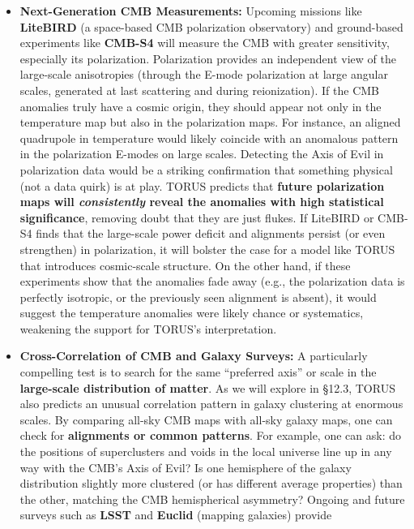 \documentclass[
]{article}
\begin{document}
\begin{itemize}
\item
  \textbf{Next-Generation CMB Measurements:} Upcoming missions like
  \textbf{LiteBIRD} (a space-based CMB polarization observatory) and
  ground-based experiments like \textbf{CMB-S4} will measure the CMB
  with greater sensitivity, especially its polarization. Polarization
  provides an independent view of the large-scale anisotropies (through
  the E-mode polarization at large angular scales, generated at last
  scattering and during reionization). If the CMB anomalies truly have a
  cosmic origin, they should appear not only in the temperature map but
  also in the polarization maps. For instance, an aligned quadrupole in
  temperature would likely coincide with an anomalous pattern in the
  polarization E-modes on large scales. Detecting the Axis of Evil in
  polarization data would be a striking confirmation that something
  physical (not a data quirk) is at play. TORUS predicts that
  \textbf{future polarization maps will \emph{consistently} reveal the
  anomalies with high statistical significance}, removing doubt that
  they are just flukes\hspace{0pt}. If LiteBIRD or CMB-S4 finds that the
  large-scale power deficit and alignments persist (or even strengthen)
  in polarization, it will bolster the case for a model like TORUS that
  introduces cosmic-scale structure. On the other hand, if these
  experiments show that the anomalies fade away (e.g., the polarization
  data is perfectly isotropic, or the previously seen alignment is
  absent), it would suggest the temperature anomalies were likely chance
  or systematics, weakening the support for TORUS's interpretation.
\item
  \textbf{Cross-Correlation of CMB and Galaxy Surveys:} A particularly
  compelling test is to search for the same ``preferred axis'' or scale
  in the \textbf{large-scale distribution of matter}. As we will explore
  in §12.3, TORUS also predicts an unusual correlation pattern in galaxy
  clustering at enormous scales. By comparing all-sky CMB maps with
  all-sky galaxy maps, one can check for \textbf{alignments or common
  patterns}. For example, one can ask: do the positions of superclusters
  and voids in the local universe line up in any way with the CMB's Axis
  of Evil? Is one hemisphere of the galaxy distribution slightly more
  clustered (or has different average properties) than the other,
  matching the CMB hemispherical asymmetry? Ongoing and future surveys
  such as \textbf{LSST} and \textbf{Euclid} (mapping galaxies) provide

\end{itemize}
\end{document}
